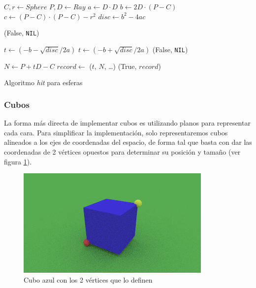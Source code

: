\begin{algorithm}
  \begin{algorithmic}[1]
    \State $C, r \gets Sphere$ 
    \State $P, D \gets Ray$ 
    \State $a \gets D \cdot D$
    \State $b \gets 2D \cdot (P - C)$
    \State $c \gets (P - C) \cdot (P - C) - r^2$
    \State $disc \gets b^2 - 4ac$

    \State \Return (False, \texttt{NIL})
    \EndIf

    \State $t \gets (-b - \sqrt{disc} / 2a)$
    \State $t \gets (-b + \sqrt{disc} / 2a)$
    \State \Return (False, \texttt{NIL})
    \EndIf
    \EndIf

    \State $N \gets P + tD - C$ 
    \State $record \gets$ ($t$, $N$, \dots) 
    \State \Return (True, $record$)
    \EndFunction
  \end{algorithmic}
  \caption{Algoritmo \textit{hit} para esferas}
  \label{alg:sphere-hit}
\end{algorithm}

\subsubsection{Cubos}

La forma más directa de implementar cubos es utilizando planos para representar
cada cara. Para simplificar la implementación, solo representaremos cubos
alineados a los ejes de coordenadas del espacio, de forma tal que basta con dar
las coordenadas de 2 vértices opuestos para determinar su posición y tamaño (ver
figura \ref{fig:box-vertices}).

\begin{figure}[H]
  \centering
  \includegraphics[width=.7\textwidth]{imgs/box-vertices.png}
  \caption{Cubo azul con los 2 vértices que lo definen}
  \label{fig:box-vertices}
\end{figure}

